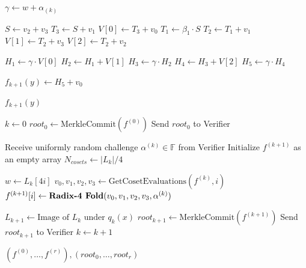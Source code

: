 \documentclass[11pt,runningheads]{llncs}
\begin{document}
\begin{algorithm}[H]
    \caption{Optimized Radix-4 FRI Folding Step}
    \label{alg:fri_folding}
    \SetAlgoLined
    { \scriptsize

    $\gamma \gets w + \alpha_{(k)}$\;

    $S \gets v_2 + v_3$\;
    $T_3 \gets S + v_1$\;
    $V[0] \gets T_3 + v_0$\;
    $T_1 \gets \beta_1 \cdot S$\;
    $T_2 \gets T_1 + v_1$\;
    $V[1] \gets T_2 + v_3$\;
    $V[2] \gets T_2 + v_2$\;

    $H_1 \gets \gamma \cdot V[0]$\;
    $H_2 \gets H_1 + V[1]$\;
    $H_3 \gets \gamma \cdot H_2$\;
    $H_4 \gets H_3 + V[2]$\;
    $H_5 \gets \gamma \cdot H_4$\;

    $f_{k+1}(y) \gets H_5 + v_0$\;

    \Return $f_{k+1}(y)$\;
    }
\end{algorithm}


\begin{algorithm}[H]
    \caption{FRI Commit Phase ($\eta=2$)}
    \label{alg:fri_commit}
    \SetAlgoLined
    { \scriptsize

    $k \gets 0$\;
    $root_0 \gets \text{MerkleCommit}(f^{(0)})$\;
    Send $root_0$ to Verifier\;
    
    {
        Receive uniformly random challenge $\alpha^{(k)} \in \mathbb{F}$ from Verifier\;
        Initialize $f^{(k+1)}$ as an empty array\;
        $N_{cosets} \gets |L_k| / 4$\;
        
        {
            $w \gets L_k[4i]$ 
            $v_0, v_1, v_2, v_3 \gets \text{GetCosetEvaluations}(f^{(k)}, i)$\;
            $f^{(k+1)}[i] \gets \text{\textbf{Radix-4 Fold}}(v_0, v_1, v_2, v_3, \alpha^{(k)})$\;
        }
        
        $L_{k+1} \gets \text{Image of } L_k \text{ under $q_k(x)$}$\;
        $root_{k+1} \gets \text{MerkleCommit}(f^{(k+1)})$\;
        Send $root_{k+1}$ to Verifier\;
        $k \gets k + 1$\;
    }
    \Return $(f^{(0)}, \dots, f^{(r)}), (root_0, \dots, root_r)$\;
    }
\end{algorithm}
\end{document}
